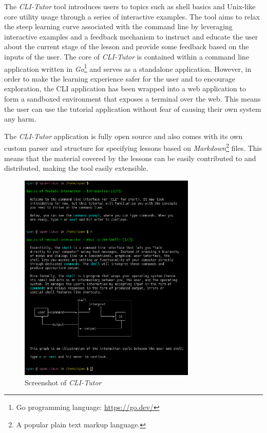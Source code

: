 The \textit{CLI-Tutor} tool introduces users to topics such as shell basics and
Unix-like core utility usage through a series of interactive examples. The tool
aims to relax the steep learning curve associated with the command line by
leveraging interactive examples and a feedback mechanism to instruct and
educate the user about the current stage of the lesson and provide some
feedback based on the inputs of the user. The core of \textit{CLI-Tutor} is
contained within a command line application written in \textit{Go}\footnote{Go
	programming language: \href{https://go.dev/}{https://go.dev/}} and serves as a
standalone application. However, in order to make the learning experience safer
for the user and to encourage exploration, the CLI application has been wrapped
into a web application to form a sandboxed environment that exposes a terminal
over the web. This means the user can use the tutorial application without fear
of causing their own system any harm.

The \textit{CLI-Tutor} application is fully open source and also comes with its
own custom parser and structure for specifying lessons based on
\textit{Markdown}\footnote{A popular plain text markup language.} files.
This means that the material covered by the lessons can be easily contributed
to and distributed, making the tool easily extensible.


\begin{figure}[H]
	\centering
	\includegraphics[width=0.75\textwidth]{img/clitutor}
	\caption{Screenshot of \textit{CLI-Tutor}}
	\label{fig:clitutor}
\end{figure}

